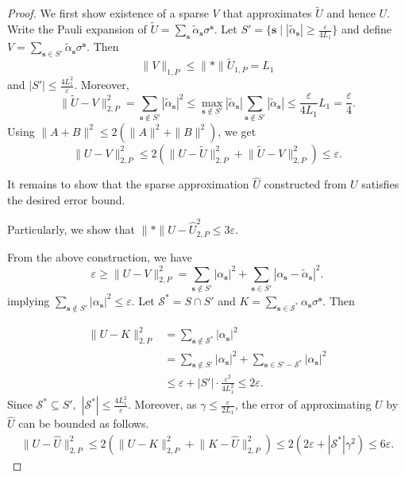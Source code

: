 \documentclass[10pt,a4paper]{amsart}
\newcommand{\CS}{\mathcal{S}}
\newcommand{\avec}[2]{\norm{#1}_{#2,P}}
\newcommand{\bfs}{\mathbf{s}}
\newcommand{\norm}[1]{\lVert#1\rVert}
\begin{document}
    \begin{proof}
        We first show existence of a sparse $V$ that approximates $\tilde{U}$ and hence $U$.
        Write the Pauli expansion of $\tilde{U} = \sum_{\bfs} \tilde{\alpha}_{\bfs} \sigma^{\bfs}$. 
        Let 
        $S' = \{\bfs \mid |\tilde{\alpha}_{\bfs}| \ge \frac{\varepsilon}{4L_1}\}$ 
        and define 
        $V = \sum_{\bfs \in S'} \tilde{\alpha}_{\bfs} \sigma^{\bfs}$. 
        Then $$\avec{V}{1}\le \norm*{\tilde{U}}_{1,P} = L_1$$ and 
        $|S'| \le \frac{4L_1^2}{\varepsilon}$.
        Moreover,
        \[
        \avec{\tilde{U} - V}{2}^2
        = \sum_{\bfs \notin S'} |\tilde{\alpha}_{\bfs}|^2
        \le \max_{\bfs \notin S'} |\tilde{\alpha}_{\bfs}| 
            \sum_{\bfs \notin S'} |\tilde{\alpha}_{\bfs}| 
        \le \frac{\varepsilon}{4L_1} L_1 = \frac{\varepsilon}{4}.
        \]
        Using $\|A+B\|^2 \le 2(\|A\|^2 + \|B\|^2)$, we get
        \[
        \avec{U - V}{2}^2
        \le 2(\avec{U - \tilde{U}}{2}^2 +\avec{\tilde{U} - V}{2}^2)
        \le \varepsilon.
        \]


        It remains to show that the sparse approximation $\hat{U}$ constructed from $U$ satisfies the desired error bound.
        
        
        Particularly, we show that  
        $\norm*{U - \hat{U}}_{2,P}^2 \le 3\varepsilon$.
        
        From the above construction, we have
        \[
        \varepsilon \ge \avec{U - V}{2}^2 
        = \sum_{\bfs \notin S'} |\alpha_{\bfs}|^2 
          + \sum_{\bfs \in S'} |\alpha_{\bfs} - \tilde{\alpha}_{\bfs}|^2.
        \]
        implying $\sum_{\bfs \notin S'} |\alpha_{\bfs}|^2 \le \varepsilon$. 
        Let $\CS^* = S \cap S'$ and 
        $K = \sum_{\bfs \in \CS^*} \alpha_{\bfs} \sigma^{\bfs}$. 
        Then
        
        \begin{align*}
            \avec{U - K}{2}^2 &=\sum_{\bfs \notin \CS^*} |\alpha_{\bfs}|^2\\
            &
            = \sum_{\bfs \notin S'} |\alpha_{\bfs}|^2 
              + \sum_{\bfs \in S' - \CS^*} |\alpha_{\bfs}|^2 \\
            &\le \varepsilon + |S'| \cdot \frac{\varepsilon^2}{4L_1^2} \le 2\varepsilon.
        \end{align*}        
        Since $\CS^* \subseteq S',$ $|\CS^*|\leq \tfrac{4L_1^2}{\varepsilon}$. Moreover, as $\gamma \leq \tfrac{\varepsilon}{2L_1}$, the error of approximating $U$ by $\hat{U}$ can be bounded as follows.   
        \begin{align*}
            \avec{U - \hat{U}}{2}^2 \leq 2(\avec{U - K}{2}^2 + \avec{K - \hat{U}}{2}^2)\leq 2(2\varepsilon + |\CS^*| \gamma^2) \leq 6\varepsilon.
        \end{align*}



\end{proof}
\end{document}
